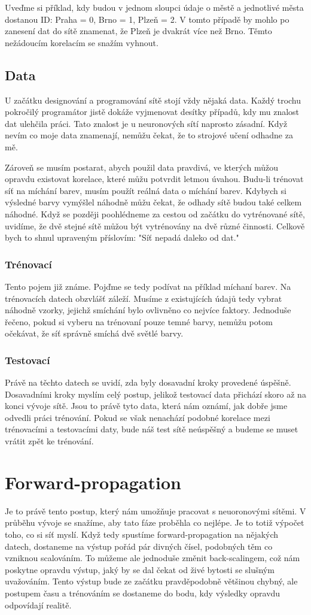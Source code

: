 \documentclass[12pt,a4paper]{report}
\begin{document}
	Uveďme si příklad, kdy budou v jednom sloupci údaje o městě a jednotlivé města dostanou ID: Praha = 0, Brno = 1, Plzeň = 2. V tomto případě by mohlo po zanesení dat do sítě znamenat, že Plzeň je dvakrát více než Brno. Těmto nežádoucím korelacím se snažím vyhnout.
	\section{Data}
	U začátku designování a programování sítě stojí vždy nějaká data. Každý trochu pokročilý programátor jistě dokáže vyjmenovat desítky případů, kdy mu znalost dat ulehčila práci. Tato znalost je u neuronových sítí naprosto zásadní. Když nevím co moje data znamenají, nemůžu čekat, že to strojové učení odhadne za mě.
	
	Zároveň se musím postarat, abych použil data pravdivá, ve kterých můžou opravdu existovat korelace, které můžu potvrdit letmou úvahou. Budu-li trénovat síť na míchání barev, musím použít reálná data o míchání barev. Kdybych si výsledné barvy vymýšlel náhodně můžu čekat, že odhady sítě budou také celkem náhodné. Když se později poohlédneme za cestou od začátku do vytrénované sítě, uvidíme, že dvě stejné sítě můžou být vytrénovány na dvě různé činnosti. Celkově bych to shnul upraveným příslovím: "Síť nepadá daleko od dat."
		\subsection{Trénovací}
		Tento pojem již známe. Pojďme se tedy podívat na příklad míchaní barev. Na trénovacích datech obzvlášť záleží. Musíme z existujících údajů tedy vybrat náhodně vzorky, jejichž smíchání bylo ovlivněno co nejvíce faktory. Jednoduše řečeno, pokud si vyberu na trénovaní pouze temné barvy, nemůžu potom očekávat, že síť správně smíchá dvě světlé barvy.
		\subsection{Testovací}
		Právě na těchto datech se uvidí, zda byly dosavadní kroky provedené úspěšně. Dosavadními kroky myslím celý postup, jelikož testovací data přichází skoro až na konci vývoje sítě. Jsou to právě tyto data, která nám oznámí, jak dobře jsme odvedli práci trénování. Pokud se však nenachází podobné korelace mezi trénovacími a testovacími daty, bude náš test sítě neúspěšný a budeme se muset vrátit zpět ke trénování.
\chapter{Forward-propagation}
	Je to právě tento postup, který nám umožňuje pracovat s neuoronovými sítěmi. V průběhu vývoje se snažíme, aby tato fáze proběhla co nejlépe. Je to totiž výpočet toho, co si síť myslí. Když tedy spustíme forward-propagation na nějakých datech, dostaneme na výstup pořád pár divných čísel, podobných těm co vzniknou scalováním. To můžeme ale jednoduše změnit back-scalingem, což nám poskytne opravdu výstup, jaký by se dal čekat od živé bytosti se slušným uvažováním. Tento výstup bude ze začátku pravděpodobně většinou chybný, ale postupem času a trénováním se dostaneme do bodu, kdy výsledky opravdu odpovídají realitě.
	
\end{document}
